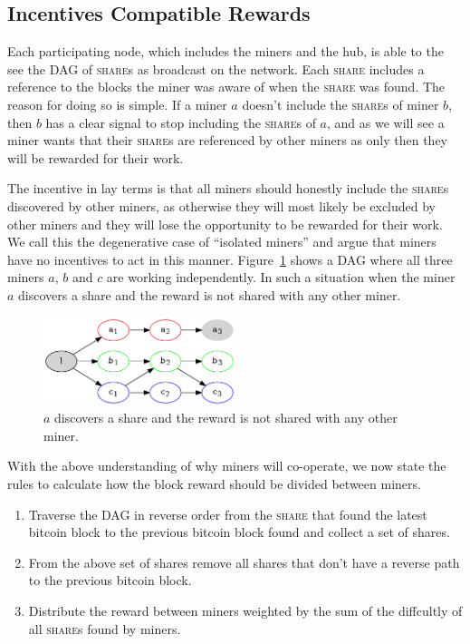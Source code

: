 \documentclass{article}
\begin{document}
  
\subsection{Incentives Compatible Rewards}\label{sec:rewards}

Each participating node, which includes the miners and the hub, is
able to the see the DAG of \textsc{share}s as broadcast on the
network. Each \textsc{share} includes a reference to the blocks the
miner was aware of when the \textsc{share} was found. The reason for
doing so is simple. If a miner $a$ doesn't include the \textsc{share}s
of miner $b$, then $b$ has a clear signal to stop including the
\textsc{share}s of $a$, and as we will see a miner wants that their
\textsc{share}s are referenced by other miners as only then they will
be rewarded for their work.

The incentive in lay terms is that all miners should honestly include
the \textsc{share}s discovered by other miners, as otherwise they will
most likely be excluded by other miners and they will lose the
opportunity to be rewarded for their work. We call this the
degenerative case of ``isolated miners'' and argue that miners have no
incentives to act in this manner. Figure~\ref{fig:isolated-miners}
shows a DAG where all three miners $a$, $b$ and $c$ are working
independently. In such a situation when the miner $a$ discovers a
share and the reward is not shared with any other miner.

\begin{figure}[h]
  \begin{center}
    \includegraphics[width=0.5\textwidth]{isolated-miners}
    \caption{$a$ discovers a share and the reward is not shared with any
      other miner.}\label{fig:isolated-miners}
  \end{center}    
\end{figure}

With the above understanding of why miners will co-operate, we now
state the rules to calculate how the block reward should be divided
between miners.

\begin{enumerate}
  \item Traverse the DAG in reverse order from the \textsc{share} that
    found the latest bitcoin block to the previous bitcoin block found
    and collect a set of shares.
  \item From the above set of shares remove all shares that don't have
    a reverse path to the previous bitcoin block.
  \item Distribute the reward between miners weighted by the sum of
    the diffcultly of all \textsc{share}s found by miners.
\end{enumerate}
\end{document}

